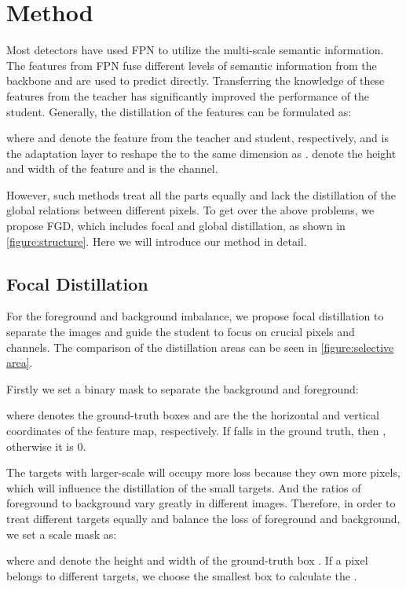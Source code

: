 \documentclass[10pt,twocolumn,letterpaper]{article}
\begin{document}
\section{Method}
\label{sec:method}

Most detectors have used FPN\cite{lin2017feature} to utilize the multi-scale semantic information. The features from FPN fuse different levels of semantic information from the backbone and are used to predict directly. Transferring the knowledge of these features from the teacher has significantly improved the performance of the student. Generally, the distillation of the features can be formulated as:

where  and  denote the feature from the teacher and student, respectively, and  is the adaptation layer to reshape the  to the same dimension as .  denote the height and width of the feature and  is the channel.

However, such methods treat all the parts equally and lack the distillation of the global relations between different pixels. To get over the above problems, we propose FGD, which includes focal and global distillation, as shown in \cref{figure:structure}. Here we will introduce our method in detail.

\subsection{Focal Distillation}
\label{sec:focal dis}
For the foreground and background imbalance, we propose focal distillation to separate the images and guide the student to focus on crucial pixels and channels. The comparison of the distillation areas can be seen in \cref{figure:selective area}.

Firstly we set a binary mask  to separate the background and foreground:

where  denotes the ground-truth boxes and  are the the horizontal and vertical coordinates of the feature map, respectively. If  falls in the ground truth, then , otherwise it is 0.

The targets with larger-scale will occupy more loss because they own more pixels, which will influence the distillation of the small targets. And the ratios of foreground to background vary greatly in different images. Therefore, in order to treat different targets equally and balance the loss of foreground and background, we set a scale mask  as:


where  and  denote the height and width of the ground-truth box . If a pixel belongs to different targets, we choose the smallest box to calculate the .
\end{document}
